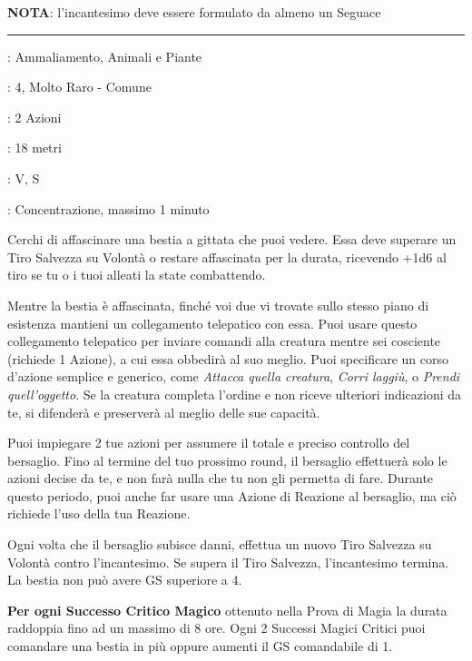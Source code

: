 \begin{multicols}{2}
\textbf{NOTA}: l'incantesimo deve essere formulato da almeno un Seguace

\smallskip\noindent\rule{\linewidth}{2pt} \hypertarget{Dominare Bestie}{}\medskip{}
\noindent
\begin{description}[noitemsep, topsep=0pt, parsep=0pt, partopsep=0pt, leftmargin=0cm, labelwidth=2.8cm]
	\item[\textbf{Lista di Magia}]: Ammaliamento, Animali e Piante
	\item[\textbf{Livello}]: 4, Molto Raro - Comune
	\item[\textbf{T. di Lancio}]: 2 Azioni
	\item[\textbf{Gittata}]: 18 metri
	\item[\textbf{Componenti}]: V, S
	\item[\textbf{Durata}]: Concentrazione, massimo 1 minuto
\end{description}

Cerchi di affascinare una bestia a gittata che puoi vedere. Essa deve superare un Tiro Salvezza su Volontà o restare affascinata per la durata, ricevendo +1d6 al tiro se tu o i tuoi alleati la state combattendo.

Mentre la bestia è affascinata, finché voi due vi trovate sullo stesso piano di esistenza mantieni un collegamento telepatico con essa. Puoi usare questo collegamento telepatico per inviare comandi alla creatura mentre sei cosciente (richiede 1 Azione), a cui essa obbedirà al suo meglio. Puoi specificare un corso d'azione semplice e generico, come \emph{Attacca quella creatura}, \emph{Corri laggiù}, o \emph{Prendi quell'oggetto}. Se la creatura completa l'ordine e non riceve ulteriori indicazioni da te, si difenderà e preserverà al meglio delle sue capacità.

Puoi impiegare 2 tue azioni per assumere il totale e preciso controllo del bersaglio. Fino al termine del tuo prossimo round, il bersaglio effettuerà solo le azioni decise da te, e non farà nulla che tu non gli permetta di fare. Durante questo periodo, puoi anche far usare una Azione di Reazione al bersaglio, ma ciò richiede l'uso della tua Reazione.

Ogni volta che il bersaglio subisce danni, effettua un nuovo Tiro Salvezza su Volontà contro l'incantesimo. Se supera il Tiro Salvezza, l'incantesimo termina. La bestia non può avere GS superiore a 4.

\textbf{Per ogni Successo Critico Magico} ottenuto nella Prova di Magia la durata raddoppia fino ad un massimo di 8 ore. Ogni 2 Successi Magici Critici puoi comandare una bestia in più oppure aumenti il GS comandabile di 1.


\end{multicols}
